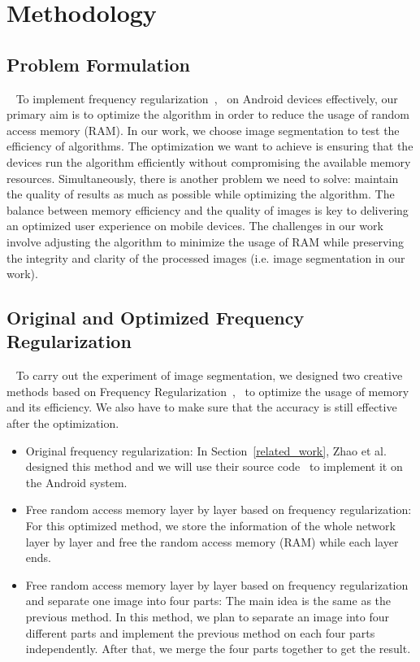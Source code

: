 \documentclass[runningheads]{llncs}
\begin{document}
\section{Methodology}\label{methodology}
\subsection{Problem Formulation}~\label{formulation}
To implement frequency regularization~\cite{zhao2023fr},~\cite{fr_repo} on Android devices effectively, our primary aim is to optimize the algorithm in order to reduce the usage of random access memory (RAM). In our work, we choose image segmentation to test the efficiency of algorithms. The optimization we want to achieve is ensuring that the devices run the algorithm efficiently without compromising the available memory resources. Simultaneously, there is another problem we need to solve: maintain the quality of results as much as possible while optimizing the algorithm. The balance between memory efficiency and the quality of images is key to delivering an optimized user experience on mobile devices. The challenges in our work involve adjusting the algorithm to minimize the usage of RAM while preserving the integrity and clarity of the processed images (i.e. image segmentation in our work).


\subsection{Original and Optimized Frequency Regularization}~\label{optimized}
To carry out the experiment of image segmentation, we designed two creative methods based on Frequency Regularization~\cite{zhao2023fr},~\cite{fr_repo}  to optimize the usage of memory and its efficiency. We also have to make sure that the accuracy is still effective after the optimization.
\begin{itemize}
	\item Original frequency regularization: In Section~\ref{related_work}, Zhao et al. designed this method and we will use their source code~\cite{fr_repo} to implement it on the Android system.
	\item Free random access memory layer by layer based on frequency regularization: For this optimized method, we store the information of the whole network layer by layer and free the random access memory (RAM) while each layer ends. 
	\item Free random access memory layer by layer based on frequency regularization and separate one image into four parts: The main idea is the same as the previous method. In this method, we plan to separate an image into four different parts and implement the previous method on each four parts independently. After that, we merge the four parts together to get the result. 
\end{itemize}	 		
\end{document}

